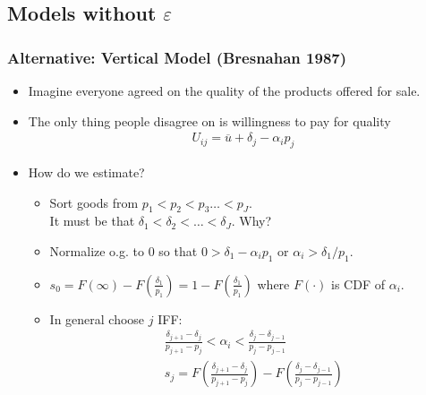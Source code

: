 \subsection*{Models without $\varepsilon$}


\begin{frame}
\frametitle{Alternative: Vertical Model (Bresnahan 1987)}
\footnotesize
\begin{itemize}
\item Imagine everyone agreed on the quality of the products offered for sale.
\item The only thing people disagree on is willingness to pay for quality
\begin{eqnarray*}
U_{ij} = \overline{u} + \delta_j - \alpha_i p_j
\end{eqnarray*}
\item How do we estimate?
\begin{itemize}
\item Sort goods from $p_1 < p_2  < p_3 \ldots < p_J$.\\
 It must be that $\delta_1 < \delta_2 < \ldots < \delta_J$. Why?
 \item Normalize o.g. to $0$ so that $ 0 > \delta_1 -\alpha_i p_1$ or $\alpha_i > \delta_1 / p_1$.
 \item $s_0 = F(\infty) - F(\frac{\delta_1}{p_1})  = 1 - F(\frac{\delta_1}{p_1}) $ where $F(\cdot)$ is CDF of $\alpha_i$.
 \item In general choose $j$ IFF:
 \begin{eqnarray*}
 \frac{\delta_{j+1} - \delta_j}{p_{j+1} -p_j} < \alpha_i < \frac{\delta_j  - \delta_{j-1}}{p_j - p_{j-1}}\\
 s_j = F\left(\frac{\delta_{j+1} - \delta_j}{p_{j+1} -p_j} \right) - F\left(\frac{\delta_j  - \delta_{j-1}}{p_j - p_{j-1}} \right)
 \end{eqnarray*}
\end{itemize}
\end{itemize}
\end{frame}

